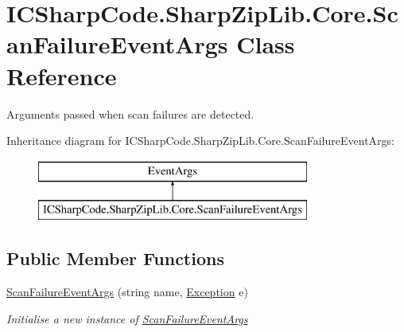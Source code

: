 \hypertarget{class_i_c_sharp_code_1_1_sharp_zip_lib_1_1_core_1_1_scan_failure_event_args}{}\section{I\+C\+Sharp\+Code.\+Sharp\+Zip\+Lib.\+Core.\+Scan\+Failure\+Event\+Args Class Reference}
\label{class_i_c_sharp_code_1_1_sharp_zip_lib_1_1_core_1_1_scan_failure_event_args}


Arguments passed when scan failures are detected.  


Inheritance diagram for I\+C\+Sharp\+Code.\+Sharp\+Zip\+Lib.\+Core.\+Scan\+Failure\+Event\+Args\+:\begin{figure}[H]
\begin{center}
\leavevmode
\includegraphics[height=2.000000cm]{class_i_c_sharp_code_1_1_sharp_zip_lib_1_1_core_1_1_scan_failure_event_args}
\end{center}
\end{figure}
\subsection*{Public Member Functions}
\begin{DoxyCompactItemize}
\item 
\hyperlink{class_i_c_sharp_code_1_1_sharp_zip_lib_1_1_core_1_1_scan_failure_event_args_a75bc9b55017a0c3c4eba9703707e4485}{Scan\+Failure\+Event\+Args} (string name, \hyperlink{class_i_c_sharp_code_1_1_sharp_zip_lib_1_1_core_1_1_scan_failure_event_args_ae0d02d556095208f78a4c1644f3aa15d}{Exception} e)
\begin{DoxyCompactList}\small\item\em Initialise a new instance of \hyperlink{class_i_c_sharp_code_1_1_sharp_zip_lib_1_1_core_1_1_scan_failure_event_args}{Scan\+Failure\+Event\+Args} \end{DoxyCompactList}\end{DoxyCompactItemize}
